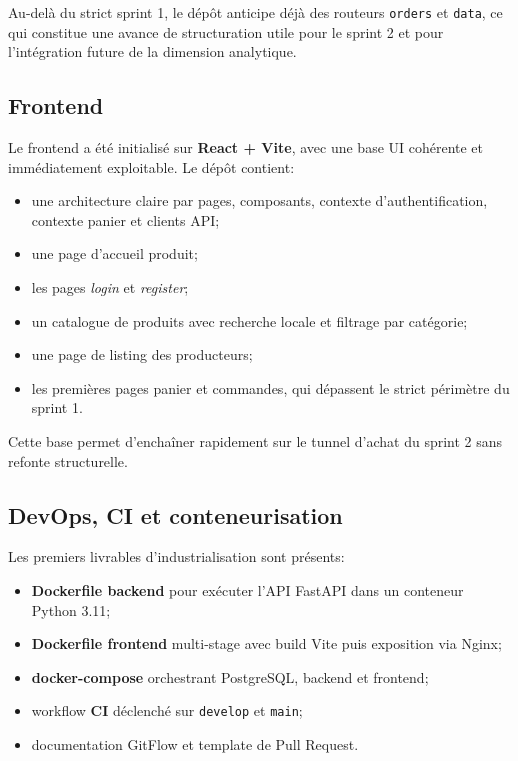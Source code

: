 \documentclass[11pt,a4paper]{article}
\begin{document}
Au-delà du strict sprint 1, le dépôt anticipe déjà des routeurs \texttt{orders} et \texttt{data}, ce qui constitue une avance de structuration utile pour le sprint 2 et pour l'intégration future de la dimension analytique.

\subsection{Frontend}

Le frontend a été initialisé sur \textbf{React + Vite}, avec une base UI cohérente et immédiatement exploitable. Le dépôt contient:

\begin{itemize}[leftmargin=1.5em]
  \item une architecture claire par pages, composants, contexte d'authentification, contexte panier et clients API;
  \item une page d'accueil produit;
  \item les pages \emph{login} et \emph{register};
  \item un catalogue de produits avec recherche locale et filtrage par catégorie;
  \item une page de listing des producteurs;
  \item les premières pages panier et commandes, qui dépassent le strict périmètre du sprint 1.
\end{itemize}

Cette base permet d'enchaîner rapidement sur le tunnel d'achat du sprint 2 sans refonte structurelle.

\subsection{DevOps, CI et conteneurisation}

Les premiers livrables d'industrialisation sont présents:

\begin{itemize}[leftmargin=1.5em]
  \item \textbf{Dockerfile backend} pour exécuter l'API FastAPI dans un conteneur Python 3.11;
  \item \textbf{Dockerfile frontend} multi-stage avec build Vite puis exposition via Nginx;
  \item \textbf{docker-compose} orchestrant PostgreSQL, backend et frontend;
  \item workflow \textbf{CI} déclenché sur \texttt{develop} et \texttt{main};
  \item documentation GitFlow et template de Pull Request.
\end{itemize}
\end{document}
